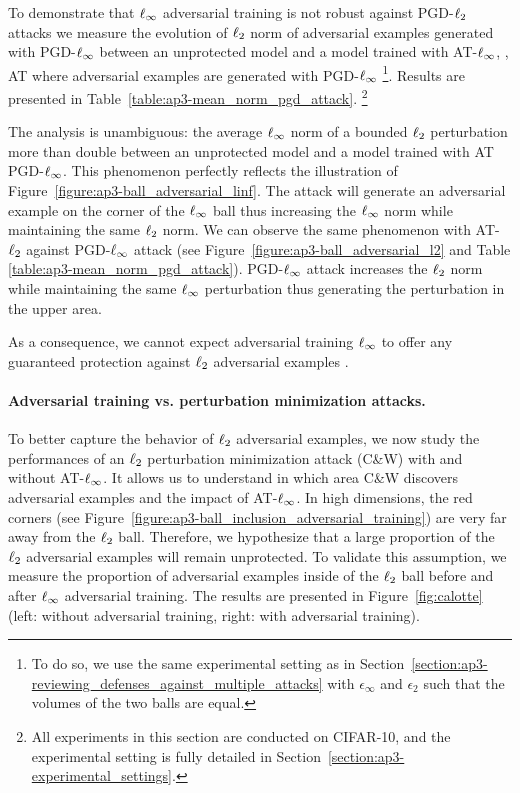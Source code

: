 To demonstrate that $\ell_\infty $ adversarial training is not robust against PGD-$\ell_2 $ attacks we measure the evolution of $\ell_2 $ norm of adversarial examples generated with PGD-$\ell_\infty $ between an unprotected model and a model trained with AT-$\ell_\infty $, \ie, AT where adversarial examples are generated with PGD-$\ell_\infty $ \footnote{To do so, we use the same experimental setting as in Section~\ref{section:ap3-reviewing_defenses_against_multiple_attacks} with $\epsilon_\infty$ and $\epsilon_2$ such that the volumes of the two balls are equal.}. 
Results are presented in  Table~\ref{table:ap3-mean_norm_pgd_attack}. \footnote{All experiments in this section are conducted on CIFAR-10, and the experimental setting is fully detailed in Section~\ref{section:ap3-experimental_settings}. }

The analysis is unambiguous: the average $\ell_\infty $ norm of a bounded $\ell_2 $ perturbation more than double between an unprotected model and a model trained with AT PGD-$\ell_\infty $. This phenomenon perfectly reflects the illustration of Figure~\ref{figure:ap3-ball_adversarial_linf}. The attack will generate an adversarial example on the corner of the $\ell_\infty $ ball thus increasing the $\ell_\infty $ norm while maintaining the same $\ell_2 $ norm. 
We can observe the same phenomenon with AT-$\ell_2 $ against PGD-$\ell_\infty $ attack (see Figure~\ref{figure:ap3-ball_adversarial_l2} and Table \ref{table:ap3-mean_norm_pgd_attack}). PGD-$\ell_\infty $ attack increases the $\ell_2 $ norm while maintaining the same $\ell_\infty $ perturbation thus generating the perturbation in the upper area. 

As a consequence, we cannot expect adversarial training $\ell_\infty $ to offer any guaranteed protection against $\ell_2 $ adversarial examples .

\paragraph{Adversarial training vs. perturbation minimization attacks.}
To better capture the behavior of $\ell_2 $ adversarial examples, we now study the performances of an $\ell_2 $ perturbation minimization attack (C\&W) with and without AT-$\ell_\infty $.
It allows us to understand in which area C\&W discovers adversarial examples and the impact of AT-$\ell_\infty $.
In high dimensions, the red corners (see Figure~\ref{figure:ap3-ball_inclusion_adversarial_training}) are very far away from the $\ell_2 $ ball.
Therefore, we hypothesize that a large proportion of the $\ell_2 $ adversarial examples will remain unprotected.
To validate this assumption, we measure the proportion of adversarial examples inside of the $\ell_2 $ ball before and after $\ell_\infty $ adversarial training.
The results are presented in Figure~\ref{fig:calotte} (left: without adversarial training, right: with adversarial training). 

